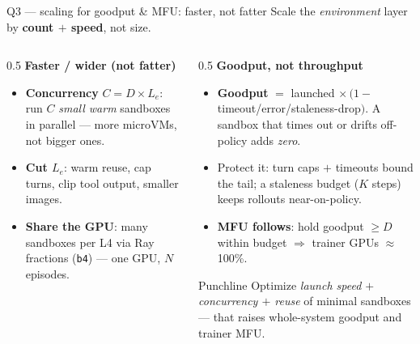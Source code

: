 \documentclass[aspectratio=169]{beamer}
\begin{document}
\begin{frame}{Q3 --- scaling for goodput \& MFU: faster, not fatter}
  \footnotesize Scale the \emph{environment} layer by \textbf{count $+$ speed}, not size.
  \begin{columns}[T]
    \begin{column}{0.5\textwidth}
      \textbf{Faster / wider (not fatter)}
      \begin{itemize}\scriptsize\setlength\itemsep{0.12em}
        \item \textbf{Concurrency} $C = D \times L_e$: run $C$ \emph{small warm} sandboxes in parallel ---
          more microVMs, not bigger ones.
        \item \textbf{Cut $L_e$}: warm reuse, cap turns, clip tool output, smaller images.
        \item \textbf{Share the GPU}: many sandboxes per L4 via Ray fractions (\texttt{b4}) --- one GPU, $N$ episodes.
      \end{itemize}
    \end{column}
    \begin{column}{0.5\textwidth}
      \textbf{Goodput, not throughput}
      \begin{itemize}\scriptsize\setlength\itemsep{0.12em}
        \item \textbf{Goodput} $=$ launched $\times\,(1 -$ timeout/error/staleness-drop$)$. A sandbox that
          times out or drifts off-policy adds \emph{zero}.
        \item Protect it: turn caps $+$ timeouts bound the tail; a staleness budget ($K$ steps) keeps rollouts near-on-policy.
        \item \textbf{MFU follows}: hold goodput $\ge D$ within budget $\Rightarrow$ trainer GPUs $\approx$100\%.
      \end{itemize}
      \begin{block}{Punchline}
        \scriptsize Optimize \emph{launch speed $+$ concurrency $+$ reuse} of minimal sandboxes --- that
        raises whole-system goodput and trainer MFU.
      \end{block}
    \end{column}
  \end{columns}
\end{frame}
\end{document}
